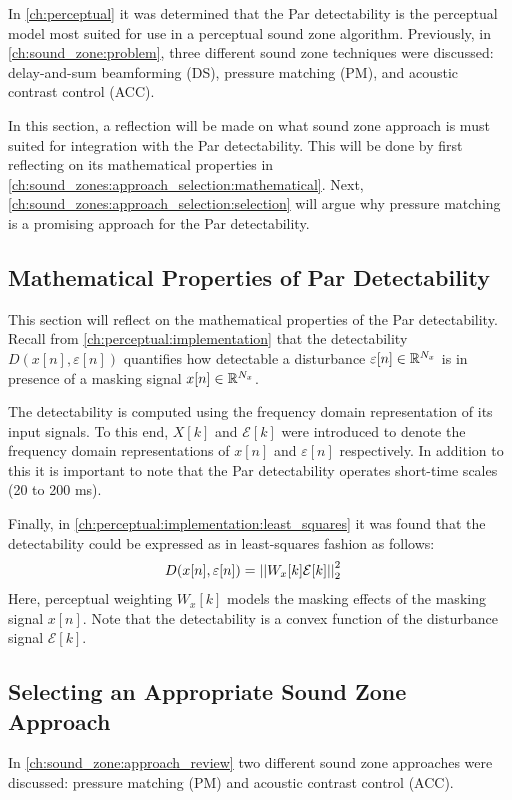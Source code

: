 In \autoref{ch:perceptual} it was determined that the Par detectability is the perceptual model most suited for use in a 
perceptual sound zone algorithm.
Previously, in \autoref{ch:sound_zone:problem}, three different sound zone techniques were discussed:
delay-and-sum beamforming (DS), pressure matching (PM), and acoustic contrast control (ACC). 

In this section, a reflection will be made on what sound zone approach is must suited for integration with the Par
detectability.
This will be done by first reflecting on its mathematical properties in \autoref{ch:sound_zones:approach_selection:mathematical}.
Next, \autoref{ch:sound_zones:approach_selection:selection} will argue why pressure matching is a promising approach for 
the Par detectability.

\subsection{Mathematical Properties of Par Detectability}
\label{ch:sound_zones:approach_selection:mathematical}
This section will reflect on the mathematical properties of the Par detectability.
Recall from \autoref{ch:perceptual:implementation} that the detectability $D(x[n],\varepsilon[n])$ quantifies how detectable a disturbance
$\varepsilon[n]\in\mathbb{R}^{N_x}$ is in presence of a masking signal $x[n]\in\mathbb{R}^{N_x}$.

The detectability is computed using the frequency domain representation of its input signals.
To this end, $X[k]$ and $\mathcal{E}[k]$ were introduced to denote the frequency domain representations of $x[n]$ and $\varepsilon[n]$ respectively.
In addition to this it is important to note that the Par detectability operates short-time scales (20 to 200 ms).

Finally, in \autoref{ch:perceptual:implementation:least_squares} it was found that the detectability could be expressed as in least-squares fashion as follows:
\begin{align}
    D(x[n],\varepsilon[n]) &= \norm[2][2]{W_x[k]\mathcal{E}[k]} 
\end{align}
Here, perceptual weighting $W_x[k]$ models the masking effects of the masking signal $x[n]$.
Note that the detectability is a convex function of the disturbance signal $\mathcal{E}[k]$. 

\subsection{Selecting an Appropriate Sound Zone Approach}
\label{ch:sound_zones:approach_selection:selection}
In \autoref{ch:sound_zone:approach_review} two different sound zone approaches were discussed: pressure matching (PM)
and acoustic contrast control (ACC).
